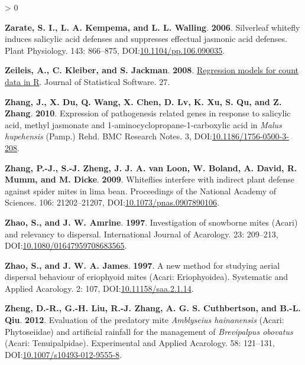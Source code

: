\documentclass{ufdissertation}[overrideChapters] %
\newlength{\cslhangindent}
\newenvironment{CSLReferences}[2] %
 {%
  \setlength{\parindent}{0pt}
  \ifodd #1 \everypar{\setlength{\hangindent}{\cslhangindent}}\ignorespaces\fi
  \ifnum #2 > 0
  \setlength{\parskip}{#2\baselineskip}
  \fi
 }%
 {}
\begin{document}
{\begin{CSLReferences}{1}{1}
\leavevmode{}%
\textbf{Zarate, S. I., L. A. Kempema, and L. L. Walling}. \textbf{2006}. Silverleaf whitefly induces salicylic acid defenses and suppresses effectual jasmonic acid defenses. Plant Physiology. 143: 866--875, DOI:\href{https://doi.org/10.1104/pp.106.090035}{10.1104/pp.106.090035}.

\leavevmode{}%
\textbf{Zeileis, A., C. Kleiber, and S. Jackman}. \textbf{2008}. \href{http://www.jstatsoft.org/v27/i08/}{Regression models for count data in {R}}. Journal of Statistical Software. 27.

\leavevmode{}%
\textbf{Zhang, J., X. Du, Q. Wang, X. Chen, D. Lv, K. Xu, S. Qu, and Z. Zhang}. \textbf{2010}. Expression of pathogenesis related genes in response to salicylic acid, methyl jasmonate and 1-aminocyclopropane-1-carboxylic acid in {\emph{Malus hupehensis}} ({Pamp.}) {Rehd}. {BMC} Research Notes. 3, DOI:\href{https://doi.org/10.1186/1756-0500-3-208}{10.1186/1756-0500-3-208}.

\leavevmode{}%
\textbf{Zhang, P.-J., S.-J. Zheng, J. J. A. van Loon, W. Boland, A. David, R. Mumm, and M. Dicke}. \textbf{2009}. Whiteflies interfere with indirect plant defense against spider mites in lima bean. Proceedings of the National Academy of Sciences. 106: 21202--21207, DOI:\href{https://doi.org/10.1073/pnas.0907890106}{10.1073/pnas.0907890106}.

\leavevmode{}%
\textbf{Zhao, S., and J. W. Amrine}. \textbf{1997}. Investigation of snowborne mites ({Acari}) and relevancy to dispersal. International Journal of Acarology. 23: 209--213, DOI:\href{https://doi.org/10.1080/01647959708683565}{10.1080/01647959708683565}.

\leavevmode{}%
\textbf{Zhao, S., and J. W. A. James}. \textbf{1997}. A new method for studying aerial dispersal behaviour of eriophyoid mites ({Acari}: {Eriophyoidea}). Systematic and Applied Acarology. 2: 107, DOI:\href{https://doi.org/10.11158/saa.2.1.14}{10.11158/saa.2.1.14}.

\leavevmode{}%
\textbf{Zheng, D.-R., G.-H. Liu, R.-J. Zhang, A. G. S. Cuthbertson, and B.-L. Qiu}. \textbf{2012}. Evaluation of the predatory mite {\emph{Amblyseius hainanensis}} ({Acari}: {Phytoseiidae}) and artificial rainfall for the management of {\emph{Brevipalpus obovatus}} ({Acari}: {Tenuipalpidae}). Experimental and Applied Acarology. 58: 121--131, DOI:\href{https://doi.org/10.1007/s10493-012-9555-8}{10.1007/s10493-012-9555-8}.


\end{CSLReferences}}
\end{document}
